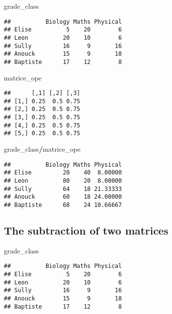 \documentclass[
]{article}
\newenvironment{Shaded}{\begin{snugshade}}{\end{snugshade}}
\newcommand{\NormalTok}[1]{#1}
\newcommand{\SpecialCharTok}[1]{\textcolor[rgb]{0.81,0.36,0.00}{\textbf{#1}}}
\begin{document}
\begin{Shaded}
\begin{Highlighting}[]
\NormalTok{grade\_class}
\end{Highlighting}
\end{Shaded}

\begin{verbatim}
##          Biology Maths Physical
## Elise          5    20        6
## Leon          20    10        6
## Sully         16     9       16
## Anouck        15     9       18
## Baptiste      17    12        8
\end{verbatim}

\begin{Shaded}
\begin{Highlighting}[]
\NormalTok{matrice\_ope}
\end{Highlighting}
\end{Shaded}

\begin{verbatim}
##      [,1] [,2] [,3]
## [1,] 0.25  0.5 0.75
## [2,] 0.25  0.5 0.75
## [3,] 0.25  0.5 0.75
## [4,] 0.25  0.5 0.75
## [5,] 0.25  0.5 0.75
\end{verbatim}

\begin{Shaded}
\begin{Highlighting}[]
\NormalTok{grade\_class}\SpecialCharTok{/}\NormalTok{matrice\_ope}
\end{Highlighting}
\end{Shaded}

\begin{verbatim}
##          Biology Maths Physical
## Elise         20    40  8.00000
## Leon          80    20  8.00000
## Sully         64    18 21.33333
## Anouck        60    18 24.00000
## Baptiste      68    24 10.66667
\end{verbatim}

\hypertarget{the-subtraction-of-two-matrices}{%
\subsection{The subtraction of two
matrices}\label{the-subtraction-of-two-matrices}}

\begin{Shaded}
\begin{Highlighting}[]
\NormalTok{grade\_class}
\end{Highlighting}
\end{Shaded}

\begin{verbatim}
##          Biology Maths Physical
## Elise          5    20        6
## Leon          20    10        6
## Sully         16     9       16
## Anouck        15     9       18
## Baptiste      17    12        8
\end{verbatim}
\end{document}
